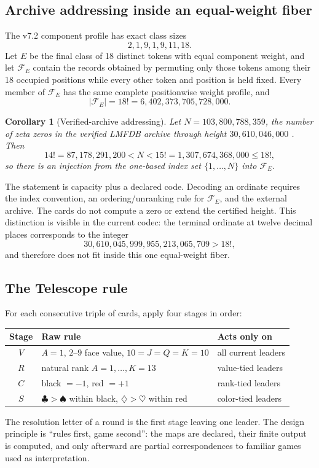 \documentclass[9pt]{extarticle}
\theoremstyle{cgplain}
\newtheorem{corollary}{Corollary}
\theoremstyle{definition}
\newcommand{\ArchiveN}{103{,}800{,}788{,}359}
\begin{document}
\subsection*{Archive addressing inside an equal-weight fiber}
The v7.2 component profile has exact class sizes
\[
2,1,9,1,9,11,18.
\]
Let $E$ be the final class of 18 distinct tokens with equal component weight, and let $\mathcal F_E$ contain the records obtained by permuting only those tokens among their 18 occupied positions while every other token and position is held fixed. Every member of $\mathcal F_E$ has the same complete positionwise weight profile, and
\[
|\mathcal F_E|=18!=6{,}402{,}373{,}705{,}728{,}000.
\]

\begin{corollary}[Verified-archive addressing]
Let $N=\ArchiveN$, the number of zeta zeros in the verified LMFDB archive through height $30{,}610{,}046{,}000$ \cite{LMFDBCompleteness}. Then
\[
14!=87{,}178{,}291{,}200<N<15!=1{,}307{,}674{,}368{,}000\le 18!,
\tag{7}
\]
so there is an injection from the one-based index set $\{1,\ldots,N\}$ into $\mathcal F_E$.
\end{corollary}

The statement is capacity plus a declared code. Decoding an ordinate requires the index convention, an ordering/unranking rule for $\mathcal F_E$, and the external archive. The cards do not compute a zero or extend the certified height. This distinction is visible in the current codec: the terminal ordinate at twelve decimal places corresponds to the integer
\[
30{,}610{,}045{,}999{,}955{,}213{,}065{,}709>18!,
\tag{8}
\]
and therefore does not fit inside this one equal-weight fiber.

\subsection*{The Telescope rule}
For each consecutive triple of cards, apply four stages in order:
\begin{center}
\begin{tabularx}{0.94\linewidth}{>{\bfseries}c X X}
\toprule
Stage & Raw rule & Acts only on \\
\midrule
$V$ & $A=1$, $2$--$9$ face value, $10=J=Q=K=10$ & all current leaders \\
$R$ & natural rank $A=1,\ldots,K=13$ & value-tied leaders \\
$C$ & black $=-1$, red $=+1$ & rank-tied leaders \\
$S$ & $\clubsuit>\spadesuit$ within black, $\diamondsuit>\heartsuit$ within red & color-tied leaders \\
\bottomrule
\end{tabularx}
\end{center}
The resolution letter of a round is the first stage leaving one leader. The design principle is ``rules first, game second'': the maps are declared, their finite output is computed, and only afterward are partial correspondences to familiar games used as interpretation.
\end{document}
